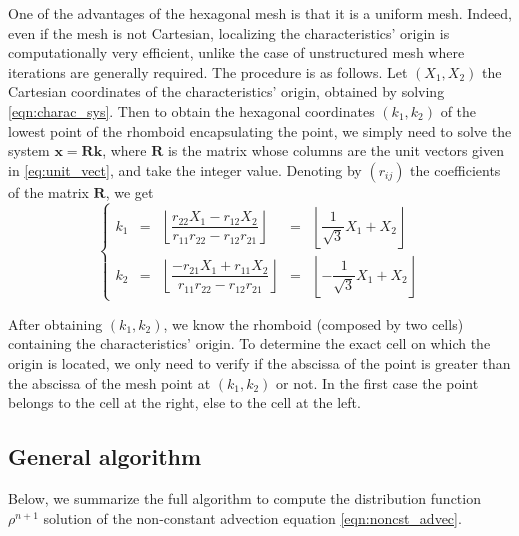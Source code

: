\documentclass[proc]{edpsmath}
\newcommand{\blue}[1]{\textcolor{blue}{#1}}
\begin{document}
One of the advantages of the hexagonal mesh is that it is a uniform mesh. Indeed, even if the mesh is not Cartesian, localizing the characteristics' origin is computationally  very efficient, unlike the case of unstructured mesh where iterations are generally required. The procedure is as follows. Let $(X_1, X_2)$ the Cartesian coordinates of the characteristics' origin, obtained by solving \eqref{eqn:charac_sys}. Then to obtain the hexagonal coordinates $(k_1, k_2)$ of the lowest point of the rhomboid encapsulating the point, we simply need to solve the system $\mathbf{x} = \mathbf{R} \mathbf{k}$, where $\mathbf{R}$ is the matrix whose columns are the unit vectors given in \eqref{eq:unit_vect}, and take the integer value.  Denoting by $(r_{ij})$ the coefficients of the matrix $\mathbf{R}$, we get
\begin{equation}
	\label{eqn:k1k2}
	\left\lbrace
	\begin{array}{lclcl}
	k_1 &=&  \left\lfloor\dfrac{ r_{22} X_1 - r_{12} X_2 }{r_{11} r_{22} - r_{12} r_{21}}\right\rfloor & = &  \left\lfloor\dfrac{1}{\sqrt{3}} X_1 + X_2\right\rfloor\\[0.3cm]
	k_2 &=&  \left\lfloor\dfrac{ - r_{21} X_1+r_{11} X_2}{r_{11} r_{22} - r_{12} r_{21}} \right\rfloor& = &\left \lfloor -\dfrac{1}{\sqrt{3}} X_1 + X_2\right\rfloor
	\end{array}\right.
\end{equation}

After obtaining $(k_1, k_2)$, we know the rhomboid (composed by two cells) containing the characteristics' origin. To determine the exact cell on which the origin is located, we only need to verify if the abscissa of the point is greater than the abscissa of the mesh point at $(k_1, k_2)$ or not. In the first case the point belongs to the cell at the right, else to the cell at the left.


\subsection{General algorithm}

Below, we summarize the full algorithm to compute the distribution function $\rho^{n+1}$ solution of the non-constant advection equation \eqref{eqn:noncst_advec}.
\end{document}

